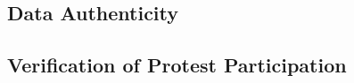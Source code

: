   
\subsection{Data Authenticity}
\label{DataAuthenticity}



\subsection{Verification of Protest Participation}
\label{ProtestVerif}


